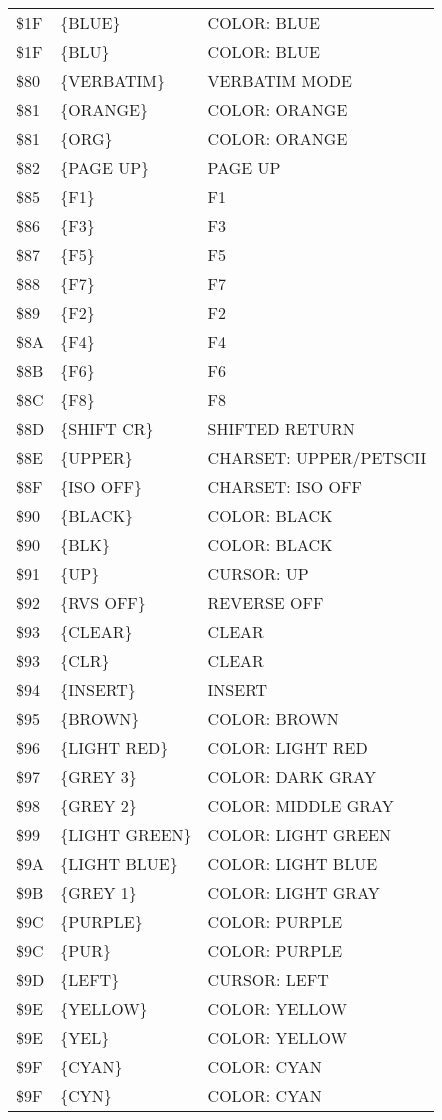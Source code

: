\documentclass{article}
\begin{document}
\begin{longtable}[l]{l l l}
        \$1F & \{BLUE\} & COLOR: BLUE\\
        \$1F & \{BLU\} & COLOR: BLUE\\
        \$80 & \{VERBATIM\} & VERBATIM MODE\\
        \$81 & \{ORANGE\} & COLOR: ORANGE\\
        \$81 & \{ORG\} & COLOR: ORANGE\\
        \$82 & \{PAGE UP\} & PAGE UP\\
        \$85 & \{F1\} & F1\\
        \$86 & \{F3\} & F3\\
        \$87 & \{F5\} & F5\\
        \$88 & \{F7\} & F7\\
        \$89 & \{F2\} & F2\\
        \$8A & \{F4\} & F4\\
        \$8B & \{F6\} & F6\\
        \$8C & \{F8\} & F8\\
        \$8D & \{SHIFT CR\} & SHIFTED RETURN\\
        \$8E & \{UPPER\} & CHARSET: UPPER/PETSCII\\
        \$8F & \{ISO OFF\} & CHARSET: ISO OFF\\
        \$90 & \{BLACK\} & COLOR: BLACK\\
        \$90 & \{BLK\} & COLOR: BLACK\\
        \$91 & \{UP\} & CURSOR: UP\\
        \$92 & \{RVS OFF\} & REVERSE OFF\\
        \$93 & \{CLEAR\} & CLEAR\\
        \$93 & \{CLR\} & CLEAR\\
        \$94 & \{INSERT\} & INSERT\\
        \$95 & \{BROWN\} & COLOR: BROWN\\
        \$96 & \{LIGHT RED\} & COLOR: LIGHT RED\\
        \$97 & \{GREY 3\} & COLOR: DARK GRAY\\
        \$98 & \{GREY 2\} & COLOR: MIDDLE GRAY\\
        \$99 & \{LIGHT GREEN\} & COLOR: LIGHT GREEN\\
        \$9A & \{LIGHT BLUE\} & COLOR: LIGHT BLUE\\
        \$9B & \{GREY 1\} & COLOR: LIGHT GRAY\\
        \$9C & \{PURPLE\} & COLOR: PURPLE\\
        \$9C & \{PUR\} & COLOR: PURPLE\\
        \$9D & \{LEFT\} & CURSOR: LEFT\\
        \$9E & \{YELLOW\} & COLOR: YELLOW\\
        \$9E & \{YEL\} & COLOR: YELLOW\\
        \$9F & \{CYAN\} & COLOR: CYAN\\
        \$9F & \{CYN\} & COLOR: CYAN\\
    \end{longtable}
\end{document}
